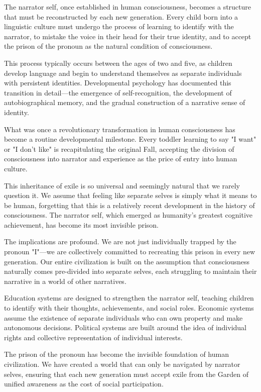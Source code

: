 The narrator self, once established in human consciousness, becomes a structure that must be reconstructed by each new generation. Every child born into a linguistic culture must undergo the process of learning to identify with the narrator, to mistake the voice in their head for their true identity, and to accept the prison of the pronoun as the natural condition of consciousness.

This process typically occurs between the ages of two and five, as children develop language and begin to understand themselves as separate individuals with persistent identities. Developmental psychology has documented this transition in detail—the emergence of self-recognition, the development of autobiographical memory, and the gradual construction of a narrative sense of identity.

What was once a revolutionary transformation in human consciousness has become a routine developmental milestone. Every toddler learning to say "I want" or "I don't like" is recapitulating the original Fall, accepting the division of consciousness into narrator and experience as the price of entry into human culture.

This inheritance of exile is so universal and seemingly natural that we rarely question it. We assume that feeling like separate selves is simply what it means to be human, forgetting that this is a relatively recent development in the history of consciousness. The narrator self, which emerged as humanity's greatest cognitive achievement, has become its most invisible prison.

The implications are profound. We are not just individually trapped by the pronoun "I"—we are collectively committed to recreating this prison in every new generation. Our entire civilization is built on the assumption that consciousness naturally comes pre-divided into separate selves, each struggling to maintain their narrative in a world of other narratives.

Education systems are designed to strengthen the narrator self, teaching children to identify with their thoughts, achievements, and social roles. Economic systems assume the existence of separate individuals who can own property and make autonomous decisions. Political systems are built around the idea of individual rights and collective representation of individual interests.

The prison of the pronoun has become the invisible foundation of human civilization. We have created a world that can only be navigated by narrator selves, ensuring that each new generation must accept exile from the Garden of unified awareness as the cost of social participation.

